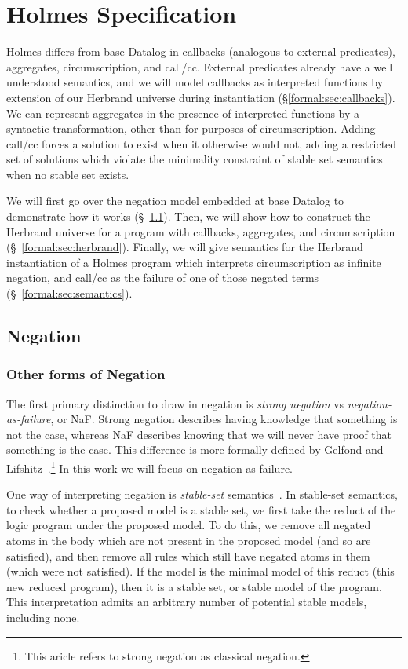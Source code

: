 
\chapter{Holmes Specification}
\label{chap:formal}
Holmes differs from base Datalog in callbacks (analogous to external predicates), aggregates, circumscription, and call/cc.
External predicates already have a well understood semantics, and we will model callbacks as interpreted functions by extension of our Herbrand universe during instantiation (\S \ref{formal:sec:callbacks}).
We can represent aggregates in the presence of interpreted functions by a syntactic transformation, other than for purposes of circumscription.
Adding call/cc forces a solution to exist when it otherwise would not, adding a restricted set of solutions which violate the minimality constraint of stable set semantics when no stable set exists.

We will first go over the negation model embedded at base Datalog to demonstrate how it works (\S~\ref{formal:sec:negation}).
Then, we will show how to construct the Herbrand universe for a program with callbacks, aggregates, and circumscription (\S~\ref{formal:sec:herbrand}).
Finally, we will give semantics for the Herbrand instantiation of a Holmes program which interprets circumscription as infinite negation, and call/cc as the failure of one of those negated terms (\S~\ref{formal:sec:semantics}).
\section{Negation}
\label{formal:sec:negation}
\subsection{Other forms of Negation}
\label{formal:sec:otherneg}
The first primary distinction to draw in negation is \emph{strong negation} vs \emph{negation-as-failure}, or NaF.
Strong negation describes having knowledge that something is not the case, whereas NaF describes knowing that we will never have proof that something is the case.
This difference is more formally defined by Gelfond and Lifshitz~\cite{strongneg}.\footnote{
This aricle refers to strong negation as classical negation.
}
In this work we will focus on negation-as-failure.

One way of interpreting negation is \emph{stable-set} semantics~\cite{stablemodel}.
In stable-set semantics, to check whether a proposed model is a stable set, we first take the reduct of the logic program under the proposed model.
To do this, we remove all negated atoms in the body which are not present in the proposed model (and so are satisfied), and then remove all rules which still have negated atoms in them (which were not satisfied).
If the model is the minimal model of this reduct (this new reduced program), then it is a stable set, or stable model of the program.
This interpretation admits an arbitrary number of potential stable models, including none.

